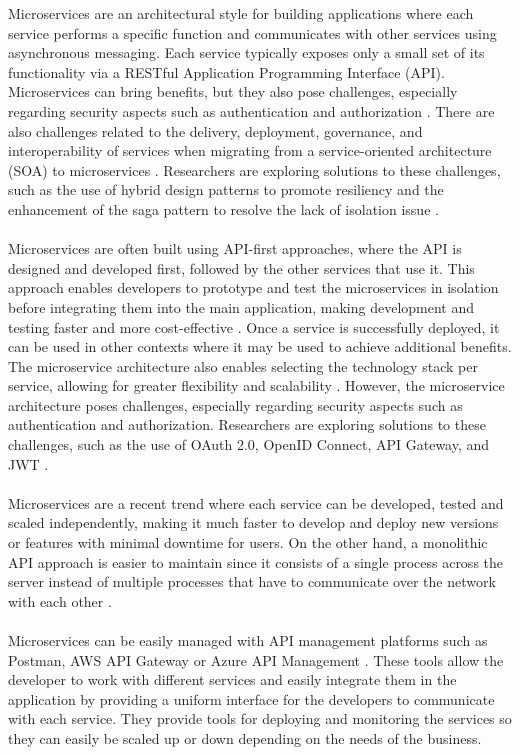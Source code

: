 \documentclass[BIF,Bachelor,nenglish]{twbook}%
\begin{document}
\noindent
Microservices are an architectural style for building applications where each service performs a specific function and communicates with other services using asynchronous messaging. Each service typically exposes only a small set of its functionality via a RESTful Application Programming Interface (API). Microservices can bring benefits, but they also pose challenges, especially regarding security aspects such as authentication and authorization \cite{alm2022} . There are also challenges related to the delivery, deployment, governance, and interoperability of services when migrating from a service-oriented architecture (SOA) to microservices\cite{raj2021} . Researchers are exploring solutions to these challenges, such as the use of hybrid design patterns to promote resiliency and the enhancement of the saga pattern to resolve the lack of isolation issue \cite{ras2022, dar2022} .
\\
\\
Microservices are often built using API-first approaches, where the API is designed and developed first, followed by the other services that use it. This approach enables developers to prototype and test the microservices in isolation before integrating them into the main application, making development and testing faster and more cost-effective \cite{alm2022} . Once a service is successfully deployed, it can be used in other contexts where it may be used to achieve additional benefits. The microservice architecture also enables selecting the technology stack per service, allowing for greater flexibility and scalability \cite{dar2022} . However, the microservice architecture poses challenges, especially regarding security aspects such as authentication and authorization. Researchers are exploring solutions to these challenges, such as the use of OAuth 2.0, OpenID Connect, API Gateway, and JWT \cite{alm2022} .
\\
\\
Microservices are a recent trend where each service can be developed, tested and scaled independently, making it much faster to develop and deploy new versions or features with minimal downtime for users. On the other hand, a monolithic API approach is easier to maintain since it consists of a single process across the server instead of multiple processes that have to communicate over the network with each other \cite{pat2021}.
\\
\\
Microservices can be easily managed with API management platforms such as Postman, AWS API Gateway or Azure API Management \cite{postman, awsApiGateway, azureApiManagement} . These tools allow the developer to work with different services and easily integrate them in the application by providing a uniform interface for the developers to communicate with each service. They provide tools for deploying and monitoring the services so they can easily be scaled up or down depending on the needs of the business.
\end{document}
